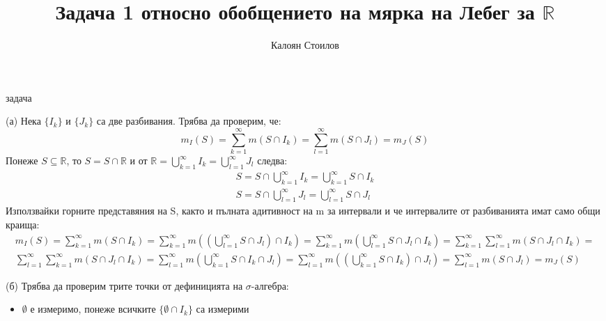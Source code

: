 \documentclass[bulgarian, 12pt]{article}
\title{\textbf{Задача 1} относно обобщението на мярка на Лебег за $\mathbb{R}$}
\author{Калоян Стоилов}
\begin{document}
\maketitle
\begin{labeling}{задача}
  \item [(а)] Нека $\{I_k\}$ и $\{J_k\}$
  са две разбивания. Трябва да проверим, че:
  \[
    m_I(S) = \sum_{k=1}^{\infty} m(S \cap I_k) = \sum_{l=1}^{\infty} m(S \cap J_l) = m_J(S)
  \]
  Понеже $S \subseteq \mathbb{R}$, то $S = S \cap \mathbb{R}$ и от $\mathbb{R} = \bigcup\limits_{k=1}^{\infty} I_k = \bigcup\limits_{l=1}^{\infty} J_l$ следва:
  \begin{eqnarray*}
   S = S \cap \bigcup\limits_{k=1}^{\infty} I_k = \bigcup\limits_{k=1}^{\infty} S \cap I_k \\
   S = S \cap \bigcup\limits_{l=1}^{\infty} J_l = \bigcup\limits_{l=1}^{\infty} S \cap J_l
  \end{eqnarray*}
  Използвайки горните представяния на S, както и пълната адитивност на m за интервали и че интервалите от разбиванията имат само общи краища:
  \begin{eqnarray*}
    m_I(S) = \sum_{k=1}^{\infty} m(S \cap I_k) = \sum_{k=1}^{\infty} m((\bigcup\limits_{l=1}^{\infty} S \cap J_l) \cap I_k) = \sum_{k=1}^{\infty} m(\bigcup\limits_{l=1}^{\infty} S \cap J_l \cap I_k) = \sum_{k=1}^{\infty} \sum_{l=1}^{\infty} m(S \cap J_l \cap I_k) = \\
    \sum_{l=1}^{\infty} \sum_{k=1}^{\infty} m(S \cap J_l \cap I_k) = \sum_{l=1}^{\infty} m(\bigcup\limits_{k=1}^{\infty} S \cap I_k \cap J_l) = \sum_{l=1}^{\infty} m((\bigcup\limits_{k=1}^{\infty} S \cap I_k) \cap J_l) = \sum_{l=1}^{\infty} m(S \cap J_l) = m_J(S)
  \end{eqnarray*}
  \item [(б)] Трябва да проверим трите точки от дефиницията на $\sigma$-алгебра:
  \begin{itemize}
    \item $\emptyset$ е измеримо, понеже всичките $\{\emptyset \cap I_k\}$ са измерими

\end{itemize}
\end{labeling}
\end{document}
